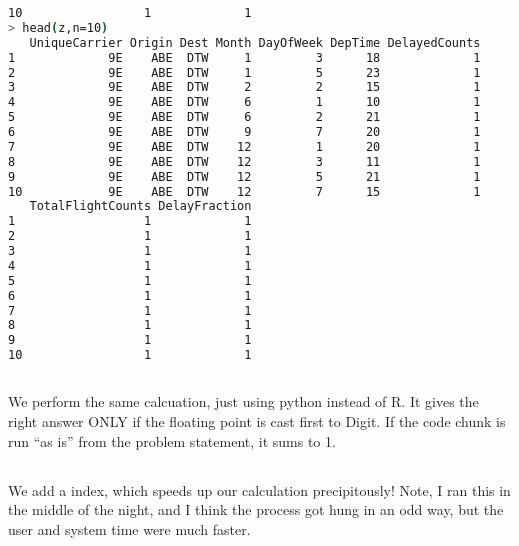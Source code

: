 \documentclass{article}\usepackage[]{graphicx}\usepackage[]{color}
\begin{document}
\begin{lstlisting}[language=bash,caption={Timing for the loading, initial (non-indexed) query}]
10                 1             1
> head(z,n=10)
   UniqueCarrier Origin Dest Month DayOfWeek DepTime DelayedCounts
1             9E    ABE  DTW     1         3      18             1
2             9E    ABE  DTW     1         5      23             1
3             9E    ABE  DTW     2         2      15             1
4             9E    ABE  DTW     6         1      10             1
5             9E    ABE  DTW     6         2      21             1
6             9E    ABE  DTW     9         7      20             1
7             9E    ABE  DTW    12         1      20             1
8             9E    ABE  DTW    12         3      11             1
9             9E    ABE  DTW    12         5      21             1
10            9E    ABE  DTW    12         7      15             1
   TotalFlightCounts DelayFraction
1                  1             1
2                  1             1
3                  1             1
4                  1             1
5                  1             1
6                  1             1
7                  1             1
8                  1             1
9                  1             1
10                 1             1
\end{lstlisting}

\subsection{}

We perform the same calcuation, just using python instead of R.  It gives the right answer ONLY if the floating point is cast first to Digit.  If the code chunk is run ``as is'' from the problem statement, it sums to 1.

\subsection{}

We add a index, which speeds up our calculation precipitously!  Note, I ran this in the middle of the night, and I think the process got hung in an odd way, but the user and system time were much faster.
\end{document}

